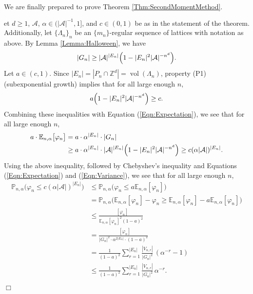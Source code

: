 \documentclass[12pt]{amsart}
\theoremstyle{definition}
\DeclareMathOperator{\Var}{Var_{n,\alpha}}
\DeclareMathOperator{\vol}{vol}
\def\EE{\mathbb{E}_{n,\alpha}}
\def\PP{\mathbb{P}_{n,\alpha}}
\newenvironment{ProofOfSecondMomentMethodThm}[1]
{\par\vskip2\parsep\noindent{\sc Proof of Theorem\ \ref{Thm:SecondMomentMethod}. }}{{\hfill
$\Box$}
\par\vskip2\parsep}
\begin{document}
We are finally prepared to prove Theorem \ref{Thm:SecondMomentMethod}.

\vspace{2mm}

\begin{ProofOfSecondMomentMethodThm}

Let $d \geq 1$, $\mathcal{A}$, $\alpha \in (|\mathcal{A}|^{-1},1]$, and $c \in (0,1)$ be as in the statement of the theorem. Additionally, let $\{\Lambda_n\}_n$ be an $\{m_n\}$-regular sequence of lattices with notation as above.
By Lemma \ref{Lemma:Halloween}, we have
\begin{equation*}
|G_n| \geq |\mathcal{A}|^{|E_n|} \Bigl( 1 - |E_n|^2 |\mathcal{A}|^{-n^d} \Bigr).
\end{equation*}
Let $a \in (c,1)$. 
Since $|E_n| = |P_n \cap \mathbb{Z}^d| = \vol(\Lambda_n)$, property (P1) (subexponential growth) implies that for all large enough $n$,
\begin{equation*}
a \Bigl( 1 - |E_n|^2 |\mathcal{A}|^{-n^d} \Bigr) \geq c.
\end{equation*}
Combining these inequalities with Equation (\ref{Eqn:Expectation}), we see that for all large enough $n$, 
\begin{align*}
a \cdot \EE \bigl[ \varphi_n \bigr] & = a \cdot \alpha^{|E_n|} \cdot |G_n| \\
 & \geq a \cdot \alpha^{|E_n|} \cdot |\mathcal{A}|^{|E_n|} \Bigl( 1 - |E_n|^2 |\mathcal{A}|^{-n^d} \Bigr)  \geq c (\alpha |\mathcal{A}| )^{|E_n|}.
\end{align*}
Using the above inequality, followed by Chebyshev's inequality and Equations (\ref{Eqn:Expectation}) and (\ref{Eqn:Variance}), we see that for all large enough $n$,
\begin{align*}
\PP \bigl( \varphi_n \leq c (\alpha |\mathcal{A}| )^{|E_n|} \bigr) & \leq 
\PP \bigl( \varphi_n \leq a \EE[\varphi_n] \bigr) \\
&  = \PP \bigl( \EE[\varphi_n] - \varphi_n \geq \EE[\varphi_n] - a \EE[\varphi_n] \bigr) \\
 & \leq \frac{\Var[ \varphi_n ]}{ \EE[\varphi_n]^2(1-a)^2 } \\
 & = \frac{\Var[ \varphi_n ]}{ |G_n|^2 \cdot \alpha^{2|E_n|} \cdot  (1-a)^2} \\
 & = \frac{1}{(1-a)^2} \sum_{r = 1}^{|E_n|} \frac{|V_{n,r}|}{|G_n|^2} \, (\alpha^{-r} -1) \\
 & \leq \frac{1}{(1-a)^2} \sum_{r = 1}^{|E_n|} \frac{|V_{n,r}|}{|G_n|^2} \, \alpha^{-r}.
\end{align*}

\end{ProofOfSecondMomentMethodThm}
\end{document}
